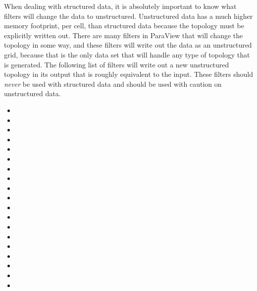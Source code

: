 When dealing with structured data, it is absolutely important to know what
filters will change the data to unstructured.  Unstructured data has a much
higher memory footprint, per cell, than structured data because the
topology must be explicitly written out.  There are many filters in
ParaView that will change the topology in some way, and these filters will
write out the data as an unstructured grid, because that is the only data
set that will handle any type of topology that is generated.  The following
list of filters will write out a new unstructured topology in its output
that is roughly equivalent to the input.  These filters should \emph{never}
be used with structured data and should be used with caution on
unstructured data.


\begin{multicols}{2}
  \begin{itemize}
  \item {}
  \item {}
  \item {}
  \item {}
  \item {}
  \item {}
  \item {}
  \item {}
  \item {}
  \item {}
  \item {}
  \item {}
  \item {}
  \item {}
  \item {}
  \item {}
  \item {}
  \item {}
  \item {}
  \end{itemize}
\end{multicols}

